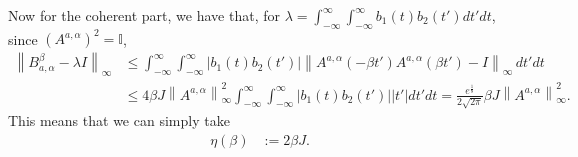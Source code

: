 \documentclass[aps,pra,amsmath,amssymb,twocolumn,10pt]{revtex4-2}
\theoremstyle{definition}
\newcommand{\norm}[1]{\left\|#1\right\|}
\begin{document}
Now for the coherent part, we have that, for $\lambda =\int_{-\infty}^\infty  \int_{-\infty}^\infty  b_1(t) b_2(t')  dt' dt$, since $(A^{a,\alpha})^2=\mathbb{I}$,
\begin{align}
	\norm{  B^\beta_{a,\alpha}- \lambda I }_\infty &\le \int_{-\infty}^\infty  \int_{-\infty}^\infty \vert b_1(t) b_2(t') \vert {\norm{A^{a,\alpha} (-\beta t') A^{a,\alpha}(\beta t')- I }_\infty}\,dt' dt
	\\ &
	\le 4 \beta J \norm{A^{a,\alpha}}_\infty^2 \int_{-\infty}^\infty  \int_{-\infty}^\infty \vert b_1(t) b_2(t') \vert \vert t'\vert dt' dt = \frac{e^{\frac{1}{8}}}{2 \sqrt{2 \pi}} \beta J \norm{A^{a,\alpha}}_\infty^2.
\end{align}
This means that we can simply take
\begin{align}
	\eta(\beta) &:=  2 \beta J.
\end{align}
\end{document}
